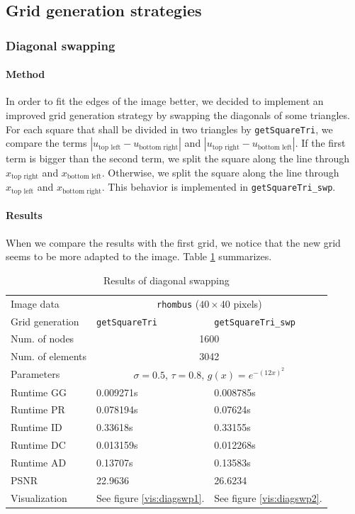 \documentclass{report}
\begin{document}
\subsection{Grid generation strategies} \label{gridgen}

\subsubsection{Diagonal swapping}
\paragraph{Method}
In order to fit the edges of the image better, we decided to implement an improved grid generation strategy by swapping the diagonals of some triangles. For each square that shall be divided in two triangles by \texttt{getSquareTri}, we compare the terms $|u_\text{top left} - u_\text{bottom right}|$ and $|u_\text{top right} - u_\text{bottom left}|$. If the first term is bigger than the second term, we split the square along the line through $x_\text{top right}$ and $x_\text{bottom left}$. Otherwise, we split the square along the line through $x_\text{top left}$ and $x_\text{bottom right}$. This behavior is implemented in \texttt{getSquareTri\_swp}.

\paragraph{Results}

When we compare the results with the first grid, we notice that the new grid seems to be more adapted to the image. Table \ref{res:diagswp} summarizes.

\begin{table}[h]
	\centering
	\begin{tabular}{|lll}
		Image data & \multicolumn{2}{c}{\texttt{rhombus} ($40 \times 40$ pixels)} \\
		Grid generation & \texttt{getSquareTri} & \texttt{getSquareTri\_swp} \\
		Num. of nodes & \multicolumn{2}{c}{1600} \\
		Num. of elements & \multicolumn{2}{c}{3042} \\
		Parameters & \multicolumn{2}{c}{$\sigma=0.5$, $\tau=0.8$, $g(x) = e^{-(12 x)^2}$} \\
		Runtime GG & 0.009271s & 0.008785s \\
		Runtime PR & 0.078194s & 0.07624s \\
		Runtime ID & 0.33618s & 0.33155s \\
		Runtime DC & 0.013159s & 0.012268s\\
		Runtime AD & 0.13707s & 0.13583s\\
		PSNR & 22.9636 & 26.6234 \\
		Visualization & See figure \ref{vis:diagswp1}. & See figure \ref{vis:diagswp2}. \\
	\end{tabular}
	\caption{Results of diagonal swapping}
	\label{res:diagswp}
\end{table}
\end{document}
